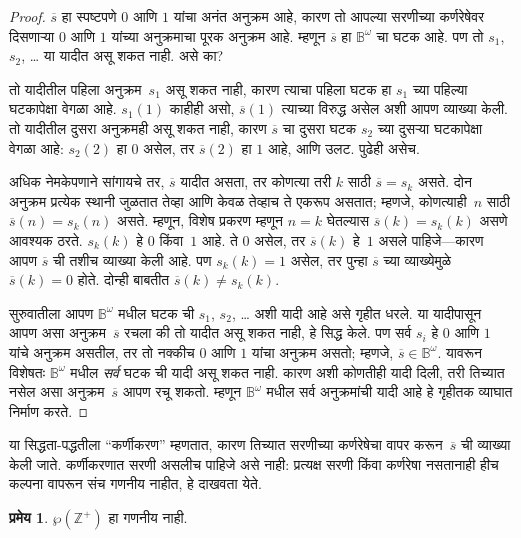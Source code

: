 \documentclass[11pt,a4paper,openany]{book}
\theoremstyle{definition}
\newtheorem{thm}[defn]{प्रमेय}
\newenvironment{explain}{}{}
\newcommand{\Pow}[1]{\wp(#1)}
\newcommand{\PosInt}{\mathbb{Z}^{+}}
\newcommand{\Bin}{\mathbb{B}}
\begin{document}
\begin{proof}
$\overline{s}$ हा स्पष्टपणे $0$ आणि $1$ यांचा अनंत अनुक्रम आहे, कारण
तो आपल्या सरणीच्या कर्णरेषेवर दिसणाऱ्या $0$ आणि $1$ यांच्या अनुक्रमाचा
पूरक अनुक्रम आहे. म्हणून $\overline{s}$ हा $\Bin^\omega$ चा
घटक आहे. पण तो $s_1$, $s_2$, \dots{} या यादीत असू शकत नाही.
असे का?

तो यादीतील पहिला अनुक्रम~$s_1$ असू शकत नाही, कारण त्याचा पहिला
घटक हा $s_1$ च्या पहिल्या घटकापेक्षा वेगळा आहे. $s_1(1)$
काहीही असो, $\overline{s}(1)$ त्याच्या विरुद्ध असेल अशी आपण व्याख्या
केली. तो यादीतील दुसरा अनुक्रमही असू शकत नाही, कारण $\overline{s}$
चा दुसरा घटक $s_2$ च्या दुसऱ्या घटकापेक्षा वेगळा आहे: $s_2(2)$ हा
$0$ असेल, तर $\overline{s}(2)$ हा $1$ आहे, आणि उलट. पुढेही असेच.

अधिक नेमकेपणाने सांगायचे तर, $\overline{s}$ यादीत असता, तर कोणत्या
तरी $k$ साठी $\overline{s} = s_{k}$ असते. दोन अनुक्रम प्रत्येक स्थानी
जुळतात तेव्हा आणि केवळ तेव्हाच ते एकरूप असतात; म्हणजे, कोणत्याही~$n$
साठी $\overline{s}(n) = s_{k}(n)$ असते. म्हणून, विशेष प्रकरण म्हणून
$n = k$ घेतल्यास $\overline{s}(k) = s_{k}(k)$ असणे आवश्यक ठरते.
$s_k(k)$ हे $0$ किंवा~$1$ आहे. ते $0$ असेल, तर $\overline{s}(k)$ हे~$1$
असले पाहिजे---कारण आपण $\overline{s}$ ची तशीच व्याख्या केली आहे. पण
$s_k(k) = 1$ असेल, तर पुन्हा $\overline{s}$ च्या व्याख्येमुळे
$\overline{s}(k) = 0$ होते. दोन्ही बाबतीत
$\overline{s}(k) \neq s_{k}(k)$.

सुरुवातीला आपण $\Bin^\omega$ मधील घटक ची $s_1$, $s_2$,
\dots{} अशी यादी आहे असे गृहीत धरले. या यादीपासून आपण असा
अनुक्रम~$\overline{s}$ रचला की तो यादीत असू शकत नाही, हे सिद्ध केले.
पण सर्व $s_i$ हे $0$ आणि $1$ यांचे अनुक्रम असतील, तर तो नक्कीच $0$
आणि $1$ यांचा अनुक्रम असतो; म्हणजे, $\overline{s} \in
\Bin^\omega$. यावरून विशेषतः $\Bin^\omega$ मधील \emph{सर्व}
घटक ची यादी असू शकत नाही. कारण अशी कोणतीही यादी दिली, तरी
तिच्यात नसेल असा अनुक्रम~$\overline{s}$ आपण रचू शकतो. म्हणून
$\Bin^\omega$ मधील सर्व अनुक्रमांची यादी आहे हे गृहीतक व्याघात निर्माण
करते.
\end{proof}

\begin{explain}
या सिद्धता-पद्धतीला ``कर्णीकरण'' म्हणतात, कारण तिच्यात सरणीच्या
कर्णरेषेचा वापर करून~$\overline{s}$ ची व्याख्या केली जाते. कर्णीकरणात
सरणी असलीच पाहिजे असे नाही: प्रत्यक्ष सरणी किंवा कर्णरेषा नसतानाही
हीच कल्पना वापरून संच गणनीय नाहीत, हे दाखवता येते.
\end{explain}

\begin{thm}
\label{sfr:siz:nen:thm:nonenum-pownat}
$\Pow{\PosInt}$ हा गणनीय नाही.
\end{thm}
\end{document}
